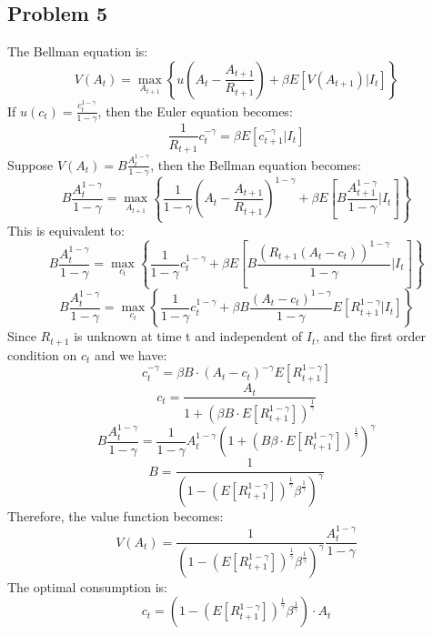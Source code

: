 \documentclass{article}
\begin{document}
\subsection{Problem 5}
The Bellman equation is:
\[
    V(A_t) = \max_{A_{t+1}} \left\{ u(A_t - \frac{A_{t+1}}{R_{t+1}}) + \beta E[V(A_{t+1}) | I_t] \right\}
\]
If \( u(c_t) = \frac{c_t^{1-\gamma}}{1-\gamma} \), then the Euler equation becomes:
\begin{equation}
    \frac{1}{R_{t+1}} c_t^{-\gamma} = \beta E\left[c_{t+1}^{-\gamma} | I_t\right]
\end{equation}
Suppose \(V(A_t) = B \frac{A_t^{1-\gamma}}{1-\gamma} \), then the Bellman equation becomes:
\begin{equation}
    B \frac{A_t^{1-\gamma}}{1-\gamma} = \max_{A_{t+1}} \left\{ \frac{1}{1-\gamma}(A_t - \frac{A_{t+1}}{R_{t+1}})^{1-\gamma} + \beta E\left[B \frac{A_{t+1}^{1-\gamma}}{1-\gamma} | I_t\right] \right\}
\end{equation}
This is equivalent to:
\begin{equation}
    B \frac{A_t^{1-\gamma}}{1-\gamma} = \max_{c_t} \left\{ \frac{1}{1-\gamma}c_t^{1-\gamma} + \beta E\left[B \frac{(R_{t+1}(A_t - c_t))^{1-\gamma}}{1-\gamma} | I_t\right] \right\}
\end{equation}
\begin{equation}
    B \frac{A_t^{1-\gamma}}{1-\gamma} = \max_{c_t} \left\{ \frac{1}{1-\gamma}c_t^{1-\gamma} + \beta B \frac{(A_t - c_t)^{1-\gamma}}{1-\gamma} E\left[R_{t+1}^{1-\gamma} | I_t\right] \right\}
\end{equation}
Since \(R_{t+1}\) is unknown at time t and independent of \(I_t\), and the first order condition on \(c_t\) and we have:
\begin{equation}
    c_t^{-\gamma} = \beta B \cdot (A_t - c_t)^{-\gamma}E\left[R_{t+1}^{1-\gamma}\right]
\end{equation}
\begin{equation}
    c_t = \frac{A_t}{1 + \left(\beta B \cdot E\left[R_{t+1}^{1-\gamma}\right] \right)^{\frac{1}{\gamma}}}
\end{equation}
\begin{equation}
    B \frac{A_t^{1-\gamma}}{1-\gamma} = \frac{1}{1-\gamma} A_t^{1-\gamma}\left(1+(B \beta \cdot E\left[R_{t+1}^{1-\gamma}\right])^{\frac{1}{\gamma}}\right)^\gamma
\end{equation}
\begin{equation}
    B = \frac{1}{\left(1-\left(E\left[R_{t+1}^{1-\gamma}\right]\right)^{\frac{1}{\gamma}}\beta^{\frac{1}{\gamma}} \right)^\gamma}
\end{equation}
Therefore, the value function becomes:
\begin{equation}
    V(A_t) = \frac{1}{\left(1-\left(E\left[R_{t+1}^{1-\gamma}\right]\right)^{\frac{1}{\gamma}}\beta^{\frac{1}{\gamma}} \right)^\gamma} \frac{A_t^{1-\gamma}}{1-\gamma}
\end{equation}
The optimal consumption is:
\begin{equation}
    c_t = \left(1-\left(E\left[R_{t+1}^{1-\gamma}\right]\right)^{\frac{1}{\gamma}}\beta^{\frac{1}{\gamma}} \right) \cdot A_t
\end{equation}
\end{document}
